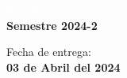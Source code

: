 \begin{titlepage}
\vspace{20mm}

\begin{minipage}{0.4\textwidth}
    \textcolor{white}{Semestre}\\
    \large\textbf{Semestre 2024-2}      
\end{minipage}
\begin{minipage}{0.4\textwidth}
    \begin{flushright}
        {\large Fecha de entrega:\\
         \textbf{03 de Abril del 2024}}
    \end{flushright}
\end{minipage}

\makeatother

\vfill 
\end{titlepage}
